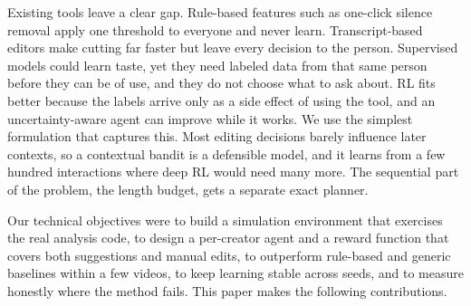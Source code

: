 \documentclass{ieeeaccess}
\begin{document}
Existing tools leave a clear gap. Rule-based features such as one-click silence removal apply one threshold to everyone and never learn. Transcript-based editors \cite{berthouzoz2012,rubin2013,huber2019} make cutting far faster but leave every decision to the person. Supervised models could learn taste, yet they need labeled data from that same person before they can be of use, and they do not choose what to ask about. RL fits better because the labels arrive only as a side effect of using the tool, and an uncertainty-aware agent can improve while it works. We use the simplest formulation that captures this. Most editing decisions barely influence later contexts, so a contextual bandit \cite{li2010,chu2011} is a defensible model, and it learns from a few hundred interactions where deep RL \cite{mnih2015,schulman2017} would need many more. The sequential part of the problem, the length budget, gets a separate exact planner.

Our technical objectives were to build a simulation environment that exercises the real analysis code, to design a per-creator agent and a reward function that covers both suggestions and manual edits, to outperform rule-based and generic baselines within a few videos, to keep learning stable across seeds, and to measure honestly where the method fails. This paper makes the following contributions.
\end{document}
